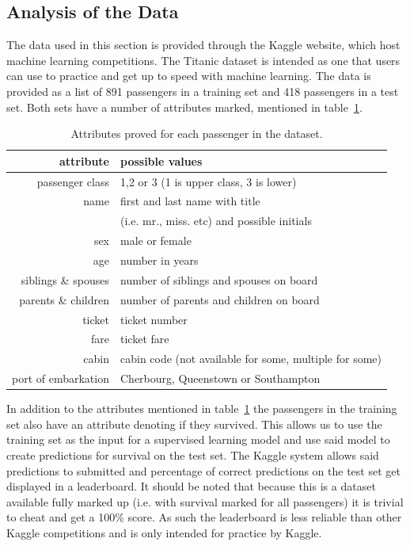 \documentclass[english, a4paper]{article}
\begin{document}
\subsection{Analysis of the Data}
The data used in this section is provided through the Kaggle website, which host machine learning competitions. The Titanic dataset is intended as one that users can use to practice and get up to speed with machine learning. The data is provided as a list of 891 passengers in a training set and 418 passengers in a test set. Both sets have a number of attributes marked, mentioned in table~\ref{tab:passenger_attributes}.
\begin{table}[H]
\caption{Attributes proved for each passenger in the dataset.}
\label{tab:passenger_attributes}
\centering
\begin{tabular}{ r | l }
  attribute & possible values \\ \hline \hline
  passenger class & 1,2 or 3 (1 is upper class, 3 is lower)  \\
  name & first and last name with title \\
  & (i.e. mr., miss. etc) and possible initials  \\
  sex & male or female \\
  age & number in years \\
  siblings \& spouses & number of siblings and spouses on board \\
  parents \& children & number of parents and children on board \\
  ticket & ticket number \\
  fare & ticket fare \\
  cabin & cabin code (not available for some, multiple for some)\\
  port of embarkation & Cherbourg, Queenstown or Southampton

\end{tabular}
\end{table}
In addition to the attributes mentioned in table~\ref{tab:passenger_attributes} the passengers in the training set also have an attribute denoting if they survived. This allows us to use the training set as the input for a supervised learning model and use said model to create predictions for survival on the test set. The Kaggle system allows said predictions to submitted and percentage of correct predictions on the test set get displayed in a leaderboard. It should be noted that because this is a dataset available fully marked up (i.e. with survival marked for all passengers) it is trivial to cheat and get a 100\% score. As such the leaderboard is less reliable than other Kaggle competitions and is only intended for practice by Kaggle. 
\end{document}
